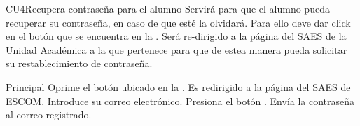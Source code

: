 \begin{UseCase}{CU4}{Recupera contraseña para el alumno}{
			\noindent Servirá para que el alumno pueda recuperar su contraseña, en caso de que esté la olvidará. Para ello deve dar click en el botón  que se encuentra en la . 
		Será re-dirigido a la página del SAES de la Unidad Académica a la que pertenece para que de estea manera pueda solicitar su restablecimiento de contraseña.	
}
		\label{CU4_Recuperaalum}
	
\end{UseCase}
\begin{UCtrayectoria}{Principal}
	\UCpaso[\UCactor] Oprime el botón  ubicado en la .
	\UCpaso Es redirigido a la página del SAES de ESCOM.
	\UCpaso[\UCactor] Introduce su correo electrónico.
	\UCpaso[\UCactor] Presiona el botón .
	\UCpaso Envía la contraseña al correo registrado.
\end{UCtrayectoria}
